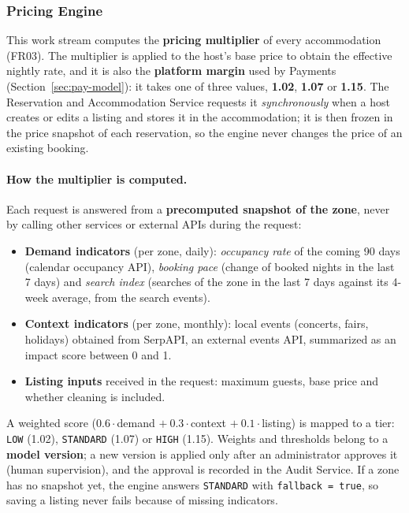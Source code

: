 \begingroup
\setlength{\emergencystretch}{3em}
\subsubsection{Pricing Engine}
\label{sec:price-style}

This work stream computes the \textbf{pricing multiplier} of every
accommodation (FR03). The multiplier is applied to the host's base price to
obtain the effective nightly rate, and it is also the \textbf{platform
margin} used by Payments (Section~\ref{sec:pay-model}): it takes one of three
values, \textbf{1.02}, \textbf{1.07} or \textbf{1.15}. The Reservation and
Accommodation Service requests it \emph{synchronously} when a host creates or
edits a listing and stores it in the accommodation; it is then frozen in the
price snapshot of each reservation, so the engine never changes the price of
an existing booking.

\paragraph{How the multiplier is computed.} Each request is answered from a
\textbf{precomputed snapshot of the zone}, never by calling other services or
external APIs during the request:
\begin{itemize}
  \item \textbf{Demand indicators} (per zone, daily): \emph{occupancy rate}
    of the coming 90 days (calendar occupancy API), \emph{booking pace}
    (change of booked nights in the last 7 days) and \emph{search index}
    (searches of the zone in the last 7 days against its 4-week average,
    from the search events).
  \item \textbf{Context indicators} (per zone, monthly): local events
    (concerts, fairs, holidays) obtained from SerpAPI, an external events
    API, summarized as an impact score between 0 and 1.
  \item \textbf{Listing inputs} received in the request: maximum guests, base
    price and whether cleaning is included.
\end{itemize}
A weighted score ($0.6\cdot$demand $+\ 0.3\cdot$context $+\ 0.1\cdot$listing)
is mapped to a tier: \texttt{LOW} (1.02), \texttt{STANDARD} (1.07) or
\texttt{HIGH} (1.15). Weights and thresholds belong to a \textbf{model
version}; a new version is applied only after an administrator approves it
(human supervision), and the approval is recorded in the Audit Service. If a
zone has no snapshot yet, the engine answers \texttt{STANDARD} with
\texttt{fallback = true}, so saving a listing never fails because of missing
indicators.

